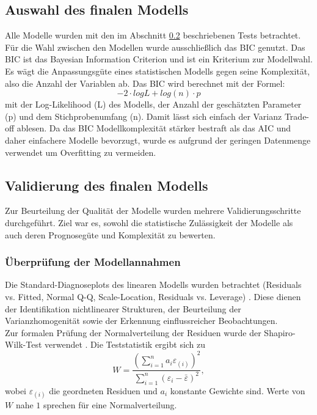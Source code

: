 \subsection{Auswahl des finalen Modells}

Alle Modelle wurden mit den im Abschnitt \ref{Validation} beschriebenen Tests betrachtet. Für die Wahl
zwischen den Modellen wurde ausschließlich das BIC genutzt. Das BIC ist das Bayesian Information
Criterion und ist ein Kriterium zur Modellwahl. Es wägt die Anpassungsgüte eines statistischen Modells gegen
seine Komplexität, also die Anzahl der Variablen ab. Das BIC wird berechnet mit der Formel:
\[-2\cdot logL+log(n)\cdot p \] mit der Log-Likelihood (L) des Modells, der Anzahl der geschätzten Parameter
(p) und dem Stichprobenumfang (n). Damit lässt sich einfach der Varianz Trade-off ablesen. Da das BIC Modellkomplexität
stärker bestraft als das AIC und daher einfachere Modelle bevorzugt, wurde es aufgrund der geringen Datenmenge
verwendet um Overfitting zu vermeiden.\\

\subsection{Validierung des finalen Modells} \label{Validation}

Zur Beurteilung der Qualität der Modelle wurden mehrere Validierungsschritte durchgeführt. Ziel war es, sowohl die statistische Zulässigkeit der Modelle als auch deren Prognosegüte und Komplexität zu bewerten.\\

\subsubsection{Überprüfung der Modellannahmen}
Die Standard-Diagnoseplots des linearen Modells wurden betrachtet (Residuals vs. Fitted, Normal Q-Q, Scale-Location, Residuals vs. Leverage) \cite{diagnosticplots}. Diese dienen der Identifikation nichtlinearer Strukturen, der Beurteilung der Varianzhomogenität sowie der Erkennung einflussreicher Beobachtungen. \\

Zur formalen Prüfung der Normalverteilung der Residuen wurde der Shapiro-Wilk-Test verwendet \cite{shapiro}. Die Teststatistik ergibt sich zu
\[W = \frac{\left( \sum_{i=1}^n a_i \varepsilon_{(i)} \right)^2}{\sum_{i=1}^n (\varepsilon_i - \bar{\varepsilon})^2},\]
wobei \(\varepsilon_{(i)}\) die geordneten Residuen und \(a_i\) konstante Gewichte sind. Werte von \(W\) nahe \(1\) sprechen für eine Normalverteilung.\\

